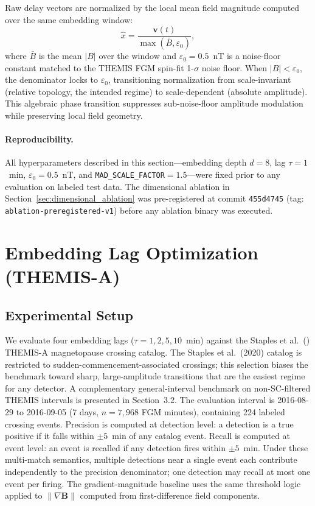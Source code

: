 \documentclass[draft]{agujournal2025}
\newcommand{\bvec}{\mathbf{B}}
\newcommand{\eps}{\varepsilon}
\let\citep\cite%
\providecommand{\citeyearpar}[1]{(\citeyear{#1})}%
\begin{document}
Raw delay vectors are normalized by the local mean field magnitude computed
over the same embedding window:
\begin{equation}
  \hat{x} = \frac{\mathbf{v}(t)}{\max(\bar{B}, \eps_0)},
  \label{eq:normalization}
\end{equation}
where $\bar{B}$ is the mean $|B|$ over the window and $\eps_0 = 0.5$~nT is a
noise-floor constant matched to the THEMIS FGM spin-fit 1-$\sigma$ noise floor.
When $|B| < \eps_0$, the denominator locks to $\eps_0$,
transitioning normalization from scale-invariant (relative topology, the intended
regime) to scale-dependent (absolute amplitude).
This algebraic phase transition suppresses sub-noise-floor amplitude modulation
while preserving local field geometry.

\paragraph{Reproducibility.}
All hyperparameters described in this section---embedding depth $d=8$,
lag $\tau=1$~min, $\eps_0 = 0.5$~nT, and \texttt{MAD\_SCALE\_FACTOR}$= 1.5$---were
fixed prior to any evaluation on labeled test data.  The dimensional ablation
in Section~\ref{sec:dimensional_ablation} was pre-registered at commit
\texttt{455d4745} (tag: \texttt{ablation-preregistered-v1}) before any
ablation binary was executed.

\section{Embedding Lag Optimization (THEMIS-A)}
\label{sec:tau_sweep}

\subsection{Experimental Setup}

We evaluate four embedding lags ($\tau = 1, 2, 5, 10$~min) against the
Staples et al.\ \citeyearpar{staples2020} THEMIS-A \citep{angelopoulos2008}
magnetopause crossing catalog.
The Staples et al.\ (2020) catalog is restricted to sudden-commencement-associated
crossings; this selection biases the benchmark toward sharp, large-amplitude
transitions that are the easiest regime for any detector.
A complementary general-interval benchmark on non-SC-filtered THEMIS intervals
is presented in Section~3.2.
The evaluation interval is 2016-08-29 to 2016-09-05 (7 days, $n = 7{,}968$
FGM \citep{auster2008} minutes), containing 224 labeled crossing events.
Precision is computed at detection level: a detection is a true positive if it
falls within $\pm 5$~min of any catalog event.
Recall is computed at event level: an event is recalled if any detection fires
within $\pm 5$~min.
Under these multi-match semantics, multiple detections near a single event each
contribute independently to the precision denominator; one detection may recall
at most one event per firing.
The gradient-magnitude baseline uses the same threshold logic applied to
$\|\nabla\bvec\|$ computed from first-difference field components.
\end{document}
